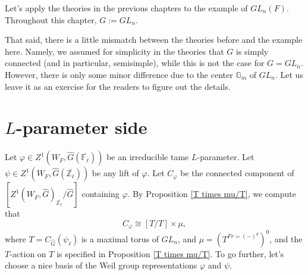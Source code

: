 Let's apply the theories in the previous chapters to the example of $GL_n(F)$. Throughout this chapter, $G:=GL_n$.

That said, there is a little mismatch between the theories before and the example here. Namely, we assumed for simplicity in the theories that $G$ is simply connected (and in particular, semisimple), while this is not the case for $G=GL_n$. However, there is only some minor difference due to the center $\mathbb{G}_m$ of $GL_n$. Let us leave it as an exercise for the readers to figure out the details.

\section{$L$-parameter side} \label{Example Lparam}
Let $\varphi \in Z^1(W_F, \hat{G}(\overline{\mathbb{F}_{\ell}}))$ be an irreducible tame $L$-parameter. Let $\psi \in Z^1(W_F, \hat{G}(\overline{\mathbb{Z}_{\ell}}))$ be any lift of $\varphi$. Let $C_{\varphi}$ be the connected component of $[Z^1(W_F, \hat{G})_{\overline{\mathbb{Z}_{\ell}}}/\hat{G}]$ containing $\varphi$. By Proposition \ref{T times mu/T}, we compute that
$$C_{\varphi} \cong [T/T] \times \mu,$$
where $T=C_{\hat{G}}(\psi_{\ell})$ is a maximal torus of $GL_n$, and $\mu=(T^{Fr=(-)^q})^0$, and the $T$-action on $T$ is specified in Proposition \ref{T times mu/T}. To go further, let's choose a nice basis of the Weil group representations $\varphi$ and $\psi$.

